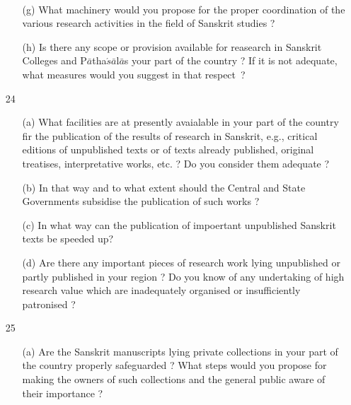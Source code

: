 {\rm 
\begin{itemize} 
\item[~]\begin{itemize}
\item[(g)] What machinery would you propose for the proper coordination of the various research activities in the field of Sanskrit studies ?
              
              \item[(h)] Is there any scope or provision available for reasearch in Sanskrit Colleges and P$\bar{a}$tha$\acute{s}\bar{a}$l$\bar{a}$s your part of the country ? If it is not adequate, what measures would you suggest in that respect~?
              \end{itemize}

\item[24] \begin{itemize}
          
          \item[(a)] What facilities are at presently avaialable in your part of the country fir the publication of the results of research in Sanskrit, e.g., critical editions of unpublished texts or of texts already published, original treatises, interpretative works, etc. ? Do you consider them adequate ?
          
          \item[(b)] In that way and to what extent should the Central and State Governments subsidise the publication of such works ?
          
          \item[(c)] In what way can the publication of impoertant unpublished Sanskrit texts be speeded up?
          
          \item[(d)] Are there any important pieces of research work lying unpublished or partly published in your region ? Do you know of any undertaking of high research value which are inadequately organised or insufficiently patronised ?
           \end{itemize} 

\item[25] \begin{itemize}
           
           \item[(a)] Are the Sanskrit manuscripts lying private collections in your part of the country properly safeguarded ? What steps would you propose for making the owners of such collections and the general public aware of their importance ?
           

\end{itemize}
\end{itemize}}
